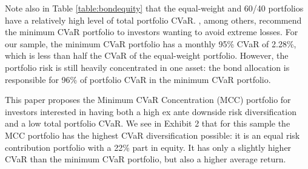 \documentclass[12pt,a4paper]{article}
\begin{document}
\begin{table}[h]
\caption{Weight and CVaR allocation of bond-equity portfolios, together with the in-sample annualized mean and monthly 95\% CVaR over
the period January 1976-June 2010.   \label{table:bondequity}  }
\vspace{1cm}
\end{table}

Note also in Table \ref{table:bondequity} that the equal-weight and 60/40 portfolios have a relatively high level of total portfolio CVaR. \citet{Rockafellar2000}, among others, recommend the minimum CVaR portfolio to investors wanting to avoid extreme losses. For our sample, the minimum CVaR portfolio has a monthly 95\% CVaR of 2.28\%, which is less than half the CVaR of the equal-weight portfolio. However, the portfolio risk is still heavily concentrated in one asset: the bond allocation is responsible for 96\% of portfolio CVaR in the minimum CVaR portfolio.

This paper proposes the Minimum CVaR Concentration (MCC) portfolio for investors interested in having both a high ex ante downside risk diversification and a low total portfolio CVaR. We see in Exhibit 2 that for this sample the MCC portfolio has the highest CVaR diversification possible: it is an equal risk contribution portfolio with a 22\% part in equity. It has only a slightly higher CVaR than the minimum CVaR portfolio, but also a higher average return.
\end{document}
